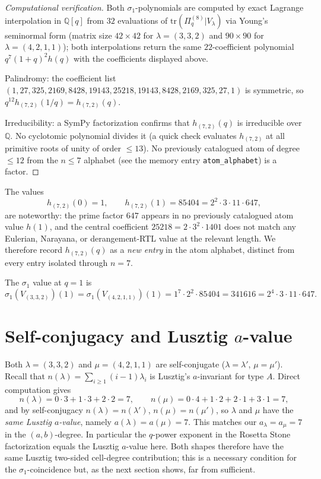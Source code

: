 \documentclass[11pt]{article}
\theoremstyle{definition}
\theoremstyle{remark}
\newcommand{\bbQ}{\mathbb{Q}}
\newcommand{\Pq}{\Pi_q}
\begin{document}
\begin{proof}[Computational verification]
Both $\sigma_1$-polynomials are computed by exact Lagrange
interpolation in $\bbQ[q]$ from $32$ evaluations of
$\mathrm{tr}(\Pq^{(8)} | V_\lambda)$ via Young's seminormal form
(matrix size $42 \times 42$ for $\lambda = (3,3,2)$ and $90 \times 90$
for $\lambda = (4,2,1,1)$); both interpolations return the same
$22$-coefficient polynomial $q^7 (1+q)^2 h(q)$ with the coefficients
displayed above.

Palindromy: the coefficient list
$(1, 27, 325, 2169, 8428, 19143, 25218, 19143, 8428, 2169, 325, 27, 1)$
is symmetric, so $q^{12} h_{(7,2)}(1/q) = h_{(7,2)}(q)$.

Irreducibility: a SymPy factorization confirms that $h_{(7,2)}(q)$ is
irreducible over $\bbQ$.  No cyclotomic polynomial divides it (a quick
check evaluates $h_{(7,2)}$ at all primitive roots of unity of order
$\le 13$).  No previously catalogued atom of degree $\le 12$ from the
$n \le 7$ alphabet (see the memory entry \texttt{atom\_alphabet}) is a
factor.
\end{proof}

The values
\[
h_{(7,2)}(0) = 1, \qquad
h_{(7,2)}(1) = 85404 = 2^{2} \cdot 3 \cdot 11 \cdot 647,
\]
are noteworthy: the prime factor $647$ appears in no previously
catalogued atom value $h(1)$, and the central coefficient $25218 =
2 \cdot 3^{2} \cdot 1401$ does not match any Eulerian, Narayana, or
derangement-RTL value at the relevant length.  We therefore record
$h_{(7,2)}(q)$ as a \emph{new entry} in the atom alphabet, distinct
from every entry isolated through $n=7$.

The $\sigma_1$ value at $q=1$ is
\[
\sigma_1(V_{(3,3,2)})(1) = \sigma_1(V_{(4,2,1,1)})(1) = 1^{7} \cdot 2^{2}
\cdot 85404 = 341616 = 2^{4} \cdot 3 \cdot 11 \cdot 647.
\]

\section{Self-conjugacy and Lusztig $a$-value}

Both $\lambda = (3,3,2)$ and $\mu = (4,2,1,1)$ are self-conjugate
($\lambda = \lambda'$, $\mu = \mu'$).  Recall that $n(\lambda) =
\sum_{i \ge 1} (i-1)\lambda_i$ is Lusztig's $a$-invariant for type $A$.
Direct computation gives
\[
n(\lambda) = 0\cdot 3 + 1\cdot 3 + 2\cdot 2 = 7, \qquad
n(\mu)     = 0\cdot 4 + 1\cdot 2 + 2\cdot 1 + 3\cdot 1 = 7,
\]
and by self-conjugacy $n(\lambda) = n(\lambda')$, $n(\mu) = n(\mu')$,
so $\lambda$ and $\mu$ have the \emph{same Lusztig $a$-value}, namely
$a(\lambda) = a(\mu) = 7$.  This matches our
$a_{\lambda} = a_{\mu} = 7$ in the $(a,b)$-degree.  In particular the
$q$-power exponent in the Rosetta Stone factorization equals the
Lusztig $a$-value here.  Both shapes therefore have the same Lusztig
two-sided cell-degree contribution; this is a necessary condition for
the $\sigma_1$-coincidence but, as the next section shows, far from
sufficient.
\end{document}
